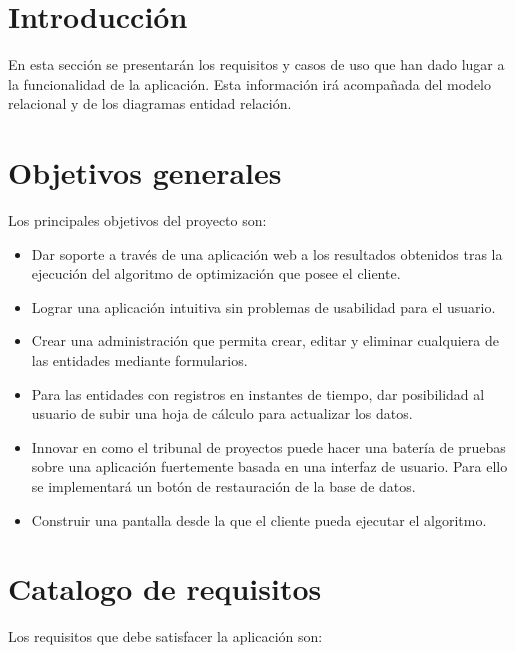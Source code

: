 
\section{Introducción}

En esta sección se presentarán los requisitos y casos de uso que han dado lugar a la funcionalidad de la aplicación. Esta información irá acompañada del modelo relacional y de los diagramas entidad relación.

\section{Objetivos generales}

Los principales objetivos del proyecto son: 

\begin{itemize}
	
	\item Dar soporte a través de una aplicación web a los resultados obtenidos tras la ejecución del algoritmo de optimización que posee el cliente.
	
	\item Lograr una aplicación intuitiva sin problemas de usabilidad para el usuario.

	\item Crear una administración que permita crear, editar y eliminar cualquiera de las entidades mediante formularios.
	
	\item Para las entidades con registros en instantes de tiempo, dar posibilidad al usuario de subir una hoja de cálculo para actualizar los datos.
	
	\item Innovar en como el tribunal de proyectos puede hacer una batería de pruebas sobre una aplicación fuertemente basada en una interfaz de usuario. Para ello se implementará un botón de restauración de la base de datos.
	
	\item Construir una pantalla desde la que el cliente pueda ejecutar el algoritmo.

\end{itemize}

\section{Catalogo de requisitos}

Los requisitos que debe satisfacer la aplicación son:

